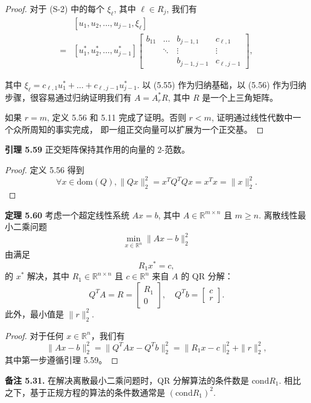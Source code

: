 \documentclass[a4paper]{ctexart}
\begin{document}
{\begin{proof}
对于 (S-2) 中的每个 $\xi_{\ell}$, 其中 $\ell \in R_j$, 我们有
\begin{align*} 
  &[u_1, u_2, \ldots, u_{j-1}, \xi_{\ell}] \\ 
    = &[u_1^*, u_2^*, \ldots, u_{j-1}^*] \begin{bmatrix} b_{11} & \ldots & b_{j-1,1} & c_{\ell,1} \\ 
      & \ddots & \vdots & \vdots \\ && b_{j-1,j-1} & c_{\ell,j-1} \end{bmatrix}, 
\end{align*} 

其中 $\xi_{\ell} = c_{\ell, 1} u_1^* + \ldots + c_{\ell, j-1} u_{j-1}^*$. 
以 (5.55) 作为归纳基础，以 (5.56) 作为归纳步骤，很容易通过归纳证明我们有 $A = A_r^* R$, 其中 $R$ 是一个上三角矩阵。
  
如果 $r = m$, 定义 5.56 和 5.11 完成了证明。否则 $r < m$, 证明通过线性代数中一个众所周知的事实完成，
即一组正交向量可以扩展为一个正交基。
\end{proof}

\noindent \textbf{引理 5.59 } 正交矩阵保持其作用的向量的 $2$-范数。
\begin{proof}
定义 5.56 得到
\[ 
  \forall x \in \text{dom}(Q), \|Q x\|_2^2 = x^T Q^T Q x = x^T x = \|x\|_2^2.
\]  
\end{proof}

\noindent \textbf{定理 5.60 } 考虑一个超定线性系统 $Ax = b$, 其中 $A \in \mathbb{R}^{m \times n}$ 且 $m \geq n$. 离散线性最小二乘问题
\[ 
  \min_{x \in \mathbb{R}^n} \|Ax - b\|_2^2 
\]
由满足
\[ 
  R_1 x^* = c, \tag{5.57} 
\]
的 $x^*$ 解决，其中 $R_1 \in \mathbb{R}^{n \times n}$ 且 $c \in \mathbb{R}^n$ 来自 $A$ 的 QR 分解：
\[ 
  Q^T A = R = \begin{bmatrix} R_1 \\ 0 \end{bmatrix}, \quad Q^T b = \begin{bmatrix} c \\ r \end{bmatrix}. \tag{5.58} 
\]
此外，最小值是 $\|r\|_2^2$.

\begin{proof}
对于任何 $x \in \mathbb{R}^n$，我们有
\[ 
  \|Ax - b\|_2^2 = \|Q^T Ax - Q^T b\|_2^2 = \|R_1 x - c\|_2^2 + \|r\|_2^2, 
\]
其中第一步遵循引理 5.59。
\end{proof}

\noindent \textbf{备注 5.31.} 在解决离散最小二乘问题时，QR 分解算法的条件数是 $\text{cond} R_1$. 
相比之下，基于正规方程的算法的条件数通常是 $(\text{cond} R_1)^2$.

}
\end{document}
